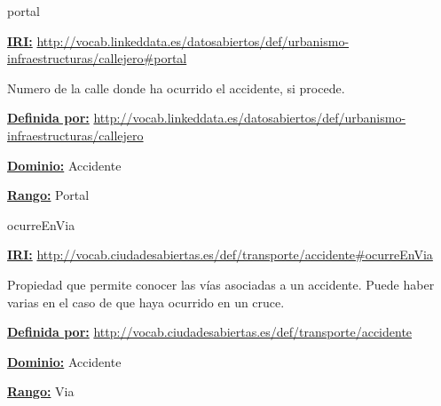 \begin{mybox}{portal}
\begin{flushleft}
\underline{\textbf{IRI:}}
\url{http://vocab.linkeddata.es/datosabiertos/def/urbanismo-infraestructuras/callejero#portal}
\newline

Numero de la calle donde ha ocurrido el accidente, si procede.
\newline

\underline{\textbf{Definida por:}}\newline
\url{http://vocab.linkeddata.es/datosabiertos/def/urbanismo-infraestructuras/callejero}
\newline

\underline{\textbf{Dominio:}} Accidente
\newline

\underline{\textbf{Rango:}} Portal
\newline

\end{flushleft}
\end{mybox}










\begin{mybox}{ocurreEnVia}
\begin{flushleft}
\underline{\textbf{IRI:}}
\url{http://vocab.ciudadesabiertas.es/def/transporte/accidente#ocurreEnVia}
\newline

Propiedad que permite conocer las vías asociadas a un accidente. Puede haber varias en el caso de que haya ocurrido en un cruce.

\underline{\textbf{Definida por:}}\newline
\url{http://vocab.ciudadesabiertas.es/def/transporte/accidente}
\newline

\underline{\textbf{Dominio:}} Accidente
\newline

\underline{\textbf{Rango:}} Via
\newline

\end{flushleft}
\end{mybox}





